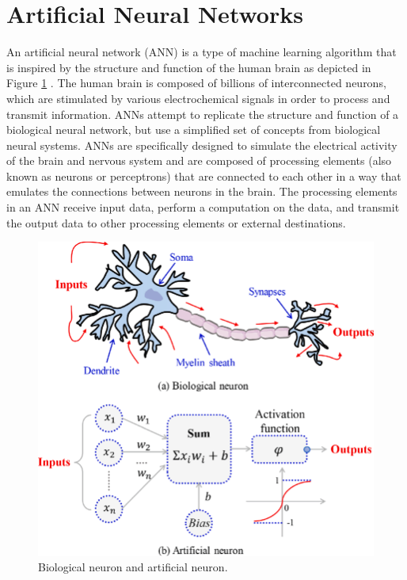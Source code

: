 \section{Artificial Neural Networks} 

An artificial neural network (ANN) is a type of machine learning algorithm that is inspired by the structure and function of the human brain  as depicted in Figure \ref{fig:neuron} \cite{karpathy2015neural}. The human brain is composed of billions of interconnected neurons, which are stimulated by various electrochemical signals in order to process and transmit information. ANNs attempt to replicate the structure and function of a biological neural network, but use a simplified set of concepts from biological neural systems. ANNs are specifically designed to simulate the electrical activity of the brain and nervous system and are composed of processing elements (also known as neurons or perceptrons) that are connected to each other in a way that emulates the connections between neurons in the brain. The processing elements in an ANN receive input data, perform a computation on the data, and transmit the output data to other processing elements or external destinations.


\begin{figure}[htbp]
   \begin{center}
      \includegraphics[width=0.6\linewidth]{Chapitre1/figures/neuronsnew.png}
   \end{center}
   \caption { Biological neuron and artificial neuron.}
   \label{fig:neuron}
\end{figure}


